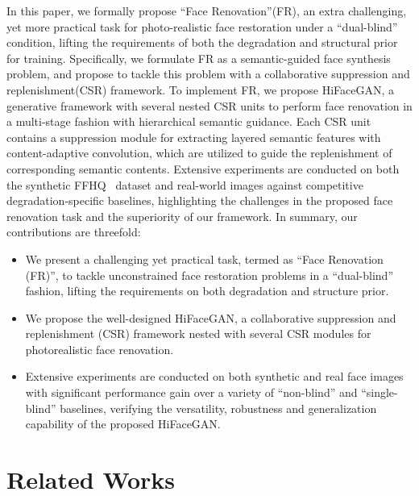 \documentclass[sigconf]{acmart}
\begin{document}
In this paper, we formally propose ``Face Renovation''(FR), an extra challenging, yet more practical task for photo-realistic face restoration under a ``dual-blind'' condition, lifting the requirements of both the degradation and structural prior for training. Specifically, we formulate FR as a semantic-guided face synthesis problem, and propose to tackle this problem with a collaborative suppression and replenishment(CSR) framework. To implement FR, we propose HiFaceGAN, a generative framework with several nested CSR units to perform face renovation in a multi-stage fashion with hierarchical semantic guidance. Each CSR unit contains a suppression module for extracting layered semantic features with content-adaptive convolution, which are utilized to guide the replenishment of corresponding semantic contents. Extensive experiments are conducted on both the synthetic FFHQ~\cite{stylegan_ffhq} dataset and real-world images against competitive degradation-specific baselines, highlighting the challenges in the proposed face renovation task and the superiority of our framework. In summary, our contributions are threefold:

\begin{itemize}
	\item We present a challenging yet practical task, termed as ``Face Renovation (FR)'', to tackle unconstrained face restoration problems in a ``dual-blind'' fashion, lifting the requirements on both degradation and structure prior.
	\item We propose the well-designed HiFaceGAN, a collaborative suppression and replenishment (CSR) framework nested with several CSR modules for photorealistic face renovation. 
	\item Extensive experiments are conducted on both synthetic and real face images with significant performance gain over a variety of ``non-blind'' and ``single-blind'' baselines, verifying the versatility, robustness and generalization capability of the proposed HiFaceGAN.
\end{itemize}

\section{Related Works} 

\begin{comment}
\begin{figure}[!t]
\texttt{[image: images/Fig-intro\_v6.pdf]}
\caption{Overview of the challenges in face renovation and the proposed framework.
}
\label{fig:intro}
\end{figure}

\end{comment}
\end{document}
